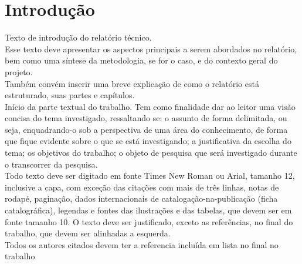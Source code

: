 \section{Introdução}

Texto de introdução do relatório técnico. \\

Esse texto deve apresentar os aspectos principais a serem abordados no relatório, bem como uma síntese da metodologia, se for o caso, e do contexto geral do projeto. \\

Também convém inserir uma breve explicação de como o relatório está estruturado, suas partes e capítulos. \\

Início da parte textual do trabalho. Tem como finalidade dar ao leitor uma visão concisa do tema investigado, ressaltando se: o assunto de forma delimitada, ou seja, enquadrando-o sob a perspectiva de uma área do conhecimento, de forma que fique evidente sobre o que se está investigando; a justificativa da escolha do tema; os objetivos do trabalho; o objeto de pesquisa que será investigado durante o transcorrer da pesquisa. \\

Todo texto deve ser digitado em fonte Times New Roman ou Arial, tamanho 12, inclusive a capa, com exceção das citações com mais de três linhas, notas de rodapé, paginação, dados internacionais de catalogação-na-publicação (ficha catalográfica), legendas e fontes das ilustrações e das tabelas, que devem ser em fonte tamanho 10. O texto deve ser justificado, exceto as referências, no final do trabalho, que devem ser alinhadas a esquerda. \\

Todos os autores citados devem ter a referencia incluída em lista no final no trabalho \\